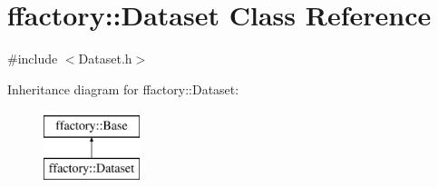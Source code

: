 \hypertarget{classffactory_1_1_dataset}{\section{ffactory\-:\-:Dataset Class Reference}
\label{classffactory_1_1_dataset}
}


{\ttfamily \#include $<$Dataset.\-h$>$}

Inheritance diagram for ffactory\-:\-:Dataset\-:\begin{figure}[H]
\begin{center}
\leavevmode
\includegraphics[height=2.000000cm]{classffactory_1_1_dataset}
\end{center}
\end{figure}
